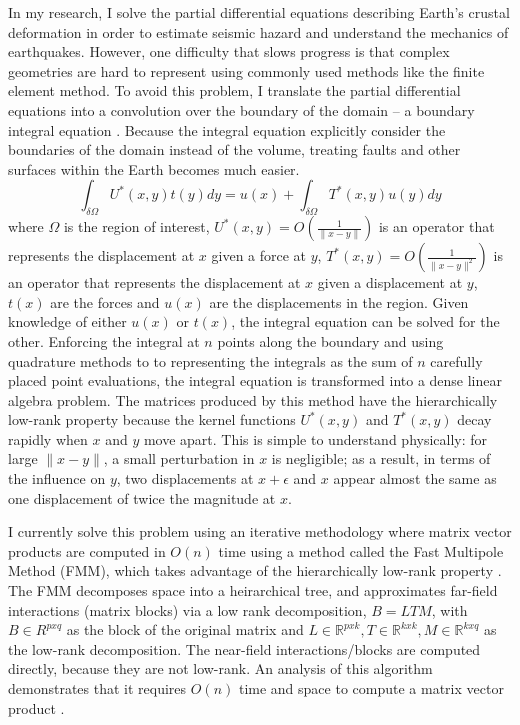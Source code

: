 \documentclass[a4paper]{article}
\newcommand{\R}{\mathbb{R}}
\begin{document}
In my research, I solve the partial differential equations describing Earth's crustal deformation in order to estimate seismic hazard and understand the mechanics of earthquakes. However, one difficulty that slows progress is that complex geometries are hard to represent using commonly used methods like the finite element method. To avoid this problem, I translate the partial differential equations into a convolution over the boundary of the domain -- a boundary integral equation \citep{Cruse1969}. Because the integral equation explicitly consider the boundaries of the domain instead of the volume, treating faults and other surfaces within the Earth becomes much easier.
\begin{equation}
    \int_{\delta\Omega} U^*(x,y) t(y) dy = u(x) + \int_{\delta \Omega} T^*(x,y) u(y) dy
\end{equation}
where $\Omega$ is the region of interest, $U^*(x,y) = O(\frac{1}{\|x-y\|})$ is an operator that represents the displacement at $x$ given a force at $y$, $T^*(x,y) = O(\frac{1}{\|x - y\|^2})$ is an operator that represents the displacement at $x$ given a displacement at $y$, $t(x)$ are the forces and $u(x)$ are the displacements in the region.  Given knowledge of either $u(x)$ or $t(x)$, the integral equation can be solved for the other. Enforcing the integral at $n$ points along the boundary and using quadrature methods to to representing the integrals as the sum of $n$ carefully placed point evaluations, the integral equation is transformed into a dense linear algebra problem. The matrices produced by this method have the hierarchically low-rank property because the kernel functions $U^*(x,y)$ and $T^*(x,y)$ decay rapidly when $x$ and $y$ move apart. This is simple to understand physically: for large $\|x - y\|$, a small perturbation in $x$ is negligible; as a result, in terms of the influence on $y$, two displacements at $x+\epsilon$ and $x$ appear almost the same as one displacement of twice the magnitude at $x$. 

I currently solve this problem using an iterative methodology where matrix vector products are computed in $O(n)$ time using a method called the Fast Multipole Method (FMM), which takes advantage of the hierarchically low-rank property \citep{Greengard1987}. The FMM decomposes space into a heirarchical tree, and approximates far-field interactions (matrix blocks) via a low rank decomposition, $B = LTM$, with $B \in R^{pxq}$ as the block of the original matrix and $L \in \R^{pxk}, T \in \R^{kxk}, M \in \R^{kxq}$ as the low-rank decomposition. The near-field interactions/blocks are computed directly, because they are not low-rank. An analysis of this algorithm demonstrates that it requires $O(n)$ time and space to compute a matrix vector product \citep{Greengard1987}.
\end{document}
